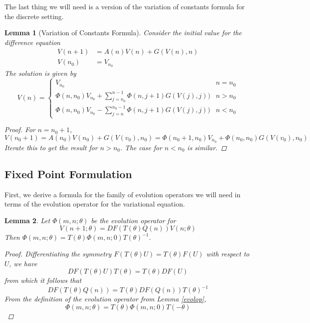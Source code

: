 \documentclass[12pt]{article}
\newtheorem{lemma}{Lemma}
\begin{document}
The last thing we will need is a version of the variation of constants formula for the discrete setting.

\begin{lemma}[Variation of Constants Formula]\label{VOC}
Consider the initial value for the difference equation
\begin{align*}
V(n+1) &= A(n) V(n) + G(V(n), n) \\
V(n_0) &= V_{n_0}
\end{align*}
The solution is given by
\begin{equation}\label{VOCformula}
V(n) = 
\begin{cases}
V_{n_0} & n = n_0 \\
\Phi(n, n_0) V_{n_0} + \sum_{j = n_0}^{n-1} \Phi(n, j+1) G(V(j), j)) & n > n_0 \\
\Phi(n, n_0) V_{n_0} - \sum_{j = n}^{n_0-1} \Phi(n, j+1) G(V(j), j)) & n < n_0 
\end{cases}
\end{equation}
\begin{proof}
For $n = n_0 + 1$,
\[
V(n_0 + 1) = A(n_0) V(n_0) + G(V(v_0), n_0) = \Phi(n_0+1, n_0) V_{n_0} + \Phi(n_0, n_0) G(V(v_0), n_0)
\]
Iterate this to get the result for $n > n_0$. The case for $n < n_0$ is similar.
\end{proof}
\end{lemma}

\subsection{Fixed Point Formulation}

First, we derive a formula for the family of evolution operators we will need in terms of the evolution operator for the variational equation.

\begin{lemma}\label{thetaevol}
Let $\Phi(m, n; \theta)$ be the evolution operator for 
\begin{equation}\label{Vtheta}
V(n+1; \theta) = DF(T(\theta)Q(n)) V(n; \theta) 
\end{equation}
Then $\Phi(m, n; \theta) = T(\theta)\Phi(m, n; 0)T(\theta)^{-1}$.
\begin{proof}
Differentiating the symmetry $F(T(\theta)U) = T(\theta)F(U)$ with respect to $U$, we have 
\[
DF(T(\theta)U)T(\theta) = T(\theta)DF(U)
\]
from which it follows that
\begin{equation}\label{DFtheta}
DF(T(\theta)Q(n)) = T(\theta)DF(Q(n))T(\theta)^{-1}
\end{equation}
From the definition of the evolution operator from Lemma \ref{evolop},
\[
\Phi(m, n; \theta) = T(\theta)\Phi(m, n; 0)T(-\theta)
\]
\end{proof}
\end{lemma}
\end{document}

